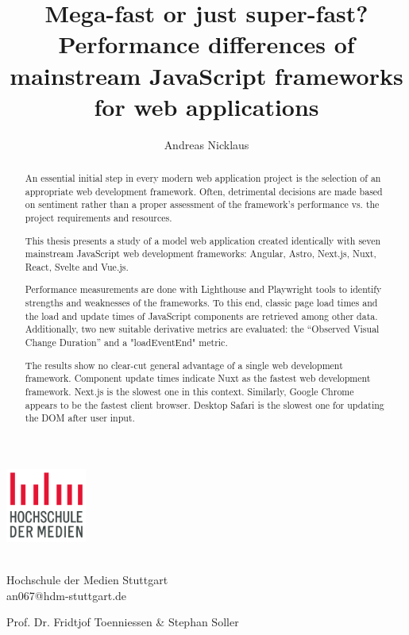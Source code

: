 \documentclass[a4paper, 12pt]{article}
\title{Mega-fast or just super-fast? Performance differences of mainstream JavaScript frameworks for web applications}
\author{Andreas Nicklaus}
\makeatletter
\let\Title\@title
\let\Author\@author
\makeatother
\begin{document}
\begin{center}
  \includegraphics[width=100px, keepaspectratio]{img/hdm-logo.png}
\end{center}	
  
\vspace{20px}
\noindent{\Large\bfseries \Title}
\vspace{10px}

\noindent\textbf{\Author}\\
Hochschule der Medien Stuttgart\\
an067@hdm-stuttgart.de 

\vspace{10px}
\noindent Prof. Dr. Fridtjof Toenniessen \& Stephan Soller

\begin{abstract}
  An essential initial step in every modern web application project is the selection of an appropriate web development framework.
  Often, detrimental decisions are made based on sentiment rather than a proper assessment of the framework's performance vs. the project requirements and resources.

  This thesis presents a study of a model web application created identically with seven mainstream JavaScript web development frameworks: Angular, Astro, Next.js, Nuxt, React, Svelte and Vue.js.

  Performance measurements are done with Lighthouse and Playwright tools to identify strengths and weaknesses of the frameworks.
  To this end, classic page load times and the load and update times of JavaScript components are retrieved among other data.
  Additionally, two new suitable derivative metrics are evaluated: the \enquote{Observed Visual Change Duration} and a "loadEventEnd" metric.

  The results show no clear-cut general advantage of a single web development framework.
  Component update times indicate Nuxt as the fastest web development framework.
  Next.js is the slowest one in this context.
  Similarly, Google Chrome appears to be the fastest client browser.
  Desktop Safari is the slowest one for updating the DOM after user input.
\end{abstract}
\end{document}
